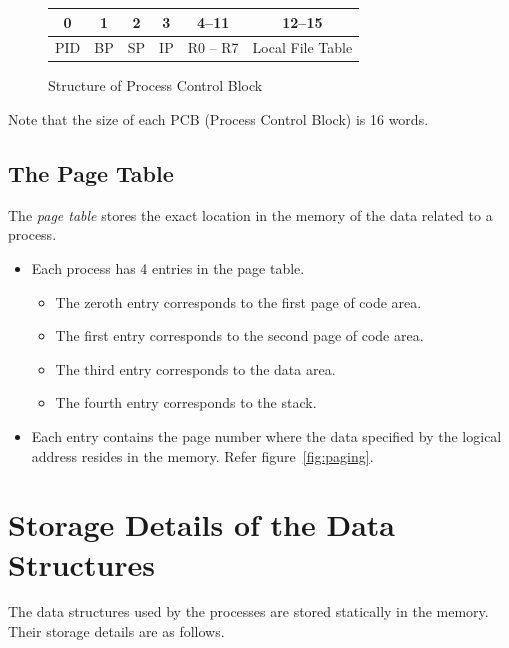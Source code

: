 \documentclass[11pt]{report}
\begin{document}
\newcommand{\pcb}[1]{
	\begin{figure}[htp!]
		\centering
		\begin{tabular}{|c|c|c|c|c|c|}
			\hline
			0 & 1 & 2 & 3 & 4--11 & 12--15 \\
			\hline
			PID & BP & SP & IP & R0 -- R7 & Local File Table \\
			\hline
		\end{tabular}
		\caption{Structure of Process Control Block}
		\label{#1}
	\end{figure}
	}

\pcb{fig:PCB}

Note that the size of each PCB (Process Control Block) is 16 words. 

\subsection{The Page Table}
\label{lbl:pgtbl}
The \emph{page table} stores the exact location in the memory of the data related to a process.
\begin{itemize}
	\item Each process has 4 entries in the page table.
	\begin{itemize}
		\item The zeroth entry corresponds to the first page of code area.
		\item The first entry corresponds to the second page of code area.
		\item The third entry corresponds to the data area.
		\item The fourth entry corresponds to the stack.
	\end{itemize}
	\item Each entry contains the page number where the data specified by the logical address resides in the memory. Refer figure~\ref{fig:paging}.
\end{itemize}

\section{Storage Details of the Data Structures}
	The data structures used by the processes are stored statically in the memory. Their storage details are as follows.\\
\end{document}
